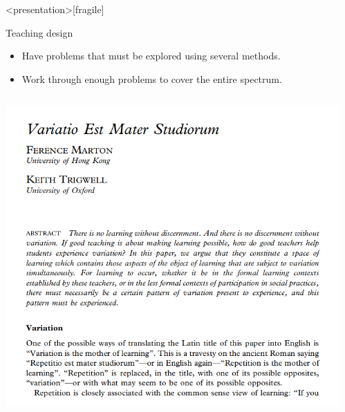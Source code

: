 \begin{frame}<presentation>[fragile]
  \begin{block}{Teaching design}
    \begin{itemize}
      \item Have problems that must be explored using several 
        methods.
      \item Work through enough problems to cover the entire spectrum.
    \end{itemize}
  \end{block}

  \begin{remark}
    \begin{columns}[T]
      \begin{column}{0.6\columnwidth}
          \centering
          \includegraphics[width=0.8\columnwidth]{figs/variatio-mater-studiorum.png}
        \end{column}
        \begin{column}{0.4\columnwidth}

\end{column}
\end{columns}
\end{remark}
\end{frame}
